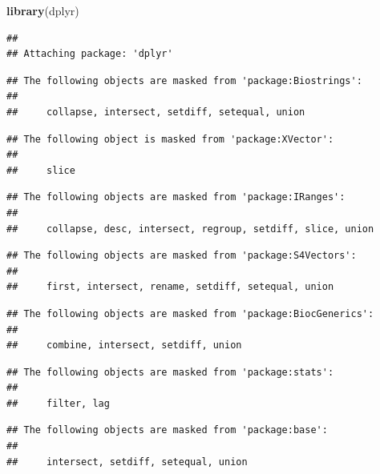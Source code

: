 \documentclass[]{article}
\newenvironment{Shaded}{\begin{snugshade}}{\end{snugshade}}
\newcommand{\KeywordTok}[1]{\textcolor[rgb]{0.13,0.29,0.53}{\textbf{{#1}}}}
\newcommand{\DataTypeTok}[1]{\textcolor[rgb]{0.13,0.29,0.53}{{#1}}}
\newcommand{\DecValTok}[1]{\textcolor[rgb]{0.00,0.00,0.81}{{#1}}}
\newcommand{\StringTok}[1]{\textcolor[rgb]{0.31,0.60,0.02}{{#1}}}
\newcommand{\NormalTok}[1]{{#1}}
\begin{document}
\begin{Shaded}
\begin{Highlighting}[]
\KeywordTok{library}\NormalTok{(dplyr)}
\end{Highlighting}
\end{Shaded}

\begin{verbatim}
## 
## Attaching package: 'dplyr'
\end{verbatim}

\begin{verbatim}
## The following objects are masked from 'package:Biostrings':
## 
##     collapse, intersect, setdiff, setequal, union
\end{verbatim}

\begin{verbatim}
## The following object is masked from 'package:XVector':
## 
##     slice
\end{verbatim}

\begin{verbatim}
## The following objects are masked from 'package:IRanges':
## 
##     collapse, desc, intersect, regroup, setdiff, slice, union
\end{verbatim}

\begin{verbatim}
## The following objects are masked from 'package:S4Vectors':
## 
##     first, intersect, rename, setdiff, setequal, union
\end{verbatim}

\begin{verbatim}
## The following objects are masked from 'package:BiocGenerics':
## 
##     combine, intersect, setdiff, union
\end{verbatim}

\begin{verbatim}
## The following objects are masked from 'package:stats':
## 
##     filter, lag
\end{verbatim}

\begin{verbatim}
## The following objects are masked from 'package:base':
## 
##     intersect, setdiff, setequal, union
\end{verbatim}

\begin{Shaded}
\end{Shaded}
\end{document}
